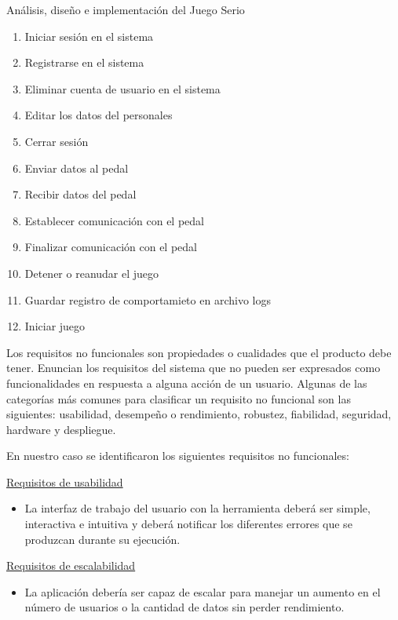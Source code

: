 \begin{thesischapter}{2} {Análisis, diseño e implementación del Juego Serio}
    \begin{enumerate}
        \item Iniciar sesión en el sistema
        \item Registrarse en el sistema
        \item Eliminar cuenta de usuario en el sistema
        \item Editar los datos del personales
        \item Cerrar sesión
        \item Enviar datos al pedal
        \item Recibir datos del pedal
        \item Establecer comunicación con el pedal
        \item Finalizar comunicación con el pedal
        \item Detener o reanudar el juego
        \item Guardar registro de comportamieto en archivo logs
        \item Iniciar juego
    \end{enumerate}
    Los requisitos no funcionales son propiedades o cualidades que el producto debe tener. Enuncian los requisitos del sistema que no pueden ser expresados como funcionalidades en respuesta a alguna acción de un usuario. Algunas de las categorías más comunes para clasificar un requisito no funcional son las siguientes: usabilidad, desempeño o rendimiento, robustez, fiabilidad, seguridad, hardware y despliegue.
    
    \vspace{10pt}
    En nuestro caso se identificaron los siguientes requisitos no funcionales:
    
    \vspace{10pt}
    \underline{Requisitos de usabilidad}
    \begin{itemize}
        \item La interfaz de trabajo del usuario con la herramienta deberá ser simple, interactiva e intuitiva y deberá notificar los diferentes errores que se produzcan durante su ejecución.
    \end{itemize}

    \underline{Requisitos de escalabilidad}
    \begin{itemize}
        \item La aplicación debería ser capaz de escalar para manejar un aumento en el número de usuarios o la cantidad de datos sin perder rendimiento.
    \end{itemize}


\end{thesischapter}
